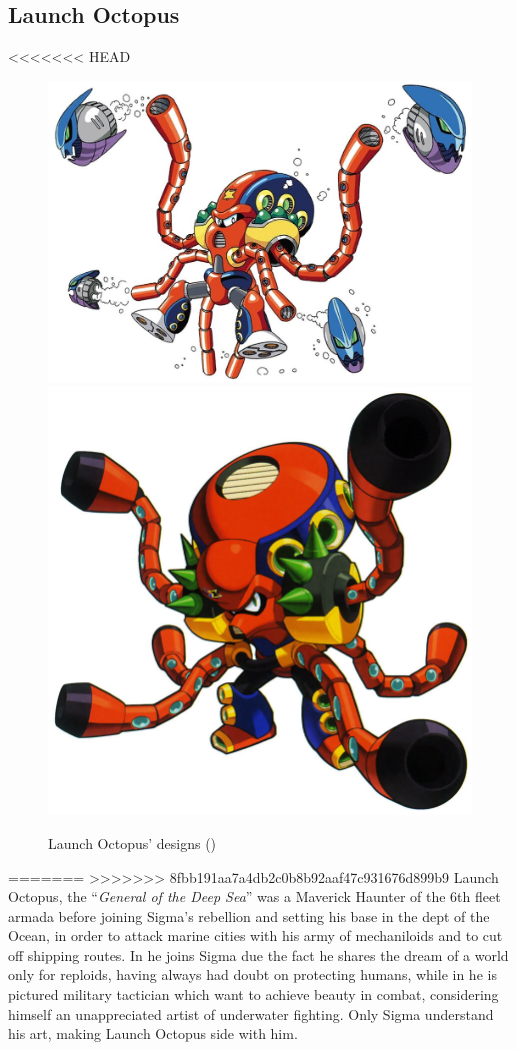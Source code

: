 \subsection{Launch Octopus}\label{boss:Launch_octopus}
<<<<<<< HEAD
\begin{figure}[htp]
	\centering
	\includegraphics[width=0.5\linewidth]{figures/X1/Launch_octopus/LaunchOctopus.jpg}
	\includegraphics[width=0.4\linewidth]{figures/X1/Launch_octopus/MHXLaunchOctopus.jpg}
	\caption{Launch Octopus' designs (\cite{book:MMX_Complete_art})}
\end{figure}

=======
>>>>>>> 8fbb191aa7a4db2c0b8b92aaf47c931676d899b9
Launch Octopus, the ``\textit{General of the Deep Sea}''\cite{book:MMX_Complete_art} was a Maverick Haunter of the 6th fleet armada before joining Sigma's rebellion and setting his base in the dept of the Ocean, in order to attack marine cities with his army of mechaniloids and to cut off shipping routes. In \x he joins Sigma due the fact he shares the dream of a world only for reploids, having always had doubt on protecting humans, while in \mhx he is pictured military tactician which want to achieve beauty in combat, considering himself an unappreciated artist of underwater fighting. Only Sigma understand his art, making Launch Octopus side with him\cite{wiki:MM_MHX_script}.


